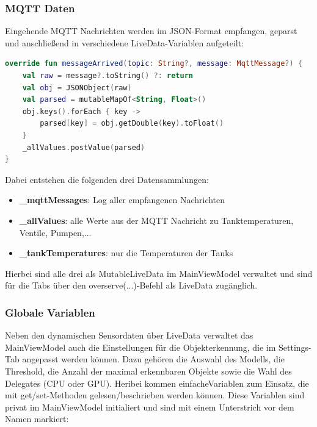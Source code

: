 \subsubsection{MQTT Daten}
Eingehende MQTT Nachrichten werden im JSON-Format empfangen, geparst und anschließend in verschiedene LiveData-Variablen aufgeteilt:
\begin{lstlisting}[language=Kotlin]
override fun messageArrived(topic: String?, message: MqttMessage?) {
    val raw = message?.toString() ?: return
    val obj = JSONObject(raw)
    val parsed = mutableMapOf<String, Float>()
    obj.keys().forEach { key ->
        parsed[key] = obj.getDouble(key).toFloat()
    }
    _allValues.postValue(parsed)
}
\end{lstlisting}
Dabei entstehen die folgenden drei Datensammlungen:
\begin{itemize}
    \item \textbf{\_mqttMessages}: Log aller empfangenen Nachrichten
    \item \textbf{\_allValues}: alle Werte aus der MQTT Nachricht zu Tanktemperaturen, Ventile, Pumpen,...
    \item \textbf{\_tankTemperatures}: nur die Temperaturen der Tanks
\end{itemize}
Hierbei sind alle drei als MutableLiveData im MainViewModel verwaltet und sind für die Tabs über den overserve(...)-Befehl als LiveData zugänglich.

\subsubsection{Globale Variablen}
Neben den dynamischen Sensordaten über LiveData verwaltet das MainViewModel auch die Einstellungen für die Objekterkennung, die im Settings-Tab angepasst werden können. Dazu gehören die Auswahl des Modells, die Threshold, die Anzahl der maximal erkennbaren Objekte sowie die Wahl des Delegates (CPU oder GPU). Heribei kommen \glqq einfache\grqq Variablen zum Einsatz, die mit get/set-Methoden gelesen/beschrieben werden können. Diese Variablen sind privat im MainViewModel initialiert und sind mit einem Unterstrich vor dem Namen markiert:

